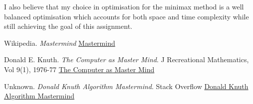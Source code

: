 \documentclass[12pt]{article}
\begin{document}
I also believe that my choice in optimisation for the minimax method is a well balanced optimisation which accounts for both space and time complexity while still achieving the goal of this assignment.

\begin{thebibliography}{3}

Wikipedia. \textit{Mastermind}
\href{https://en.wikipedia.org/wiki/Mastermind_(board_game)}
{Mastermind}

Donald E. Knuth. \textit{The Computer as Master Mind}. J Recreational Mathematics, Vol 9(1), 1976-77
\href{https://www.cs.uni.edu/~wallingf/teaching/cs3530/resources/knuth-mastermind.pdf}{The Computer as Master Mind}

Unknown. \textit{Donald Knuth Algorithm Mastermind}. Stack Overflow
\href{https://stackoverflow.com/questions/62430071/donald-knuth-algorithm-mastermind}{Donald Knuth Algorithm Mastermind}

\end{thebibliography}






\end{document}
